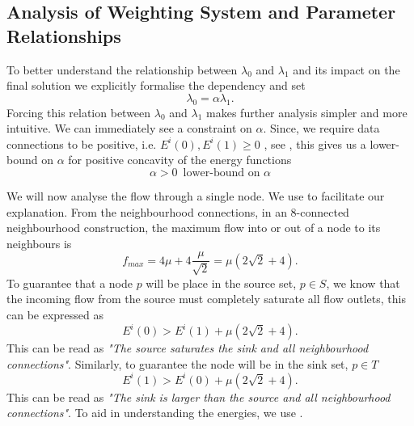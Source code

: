 \subsection{Analysis of Weighting System and Parameter Relationships}
\label{sec:cvgc_analysis}


To better understand the relationship between $\lambda_0$ and $\lambda_1$ and its impact on the final solution we explicitly formalise the dependency and set
\begin{equation}
	\lambda_0 = \alpha\lambda_1.
	\label{eq:l0l1dependancy}
\end{equation}
Forcing this relation between $\lambda_0$ and $\lambda_1$ makes further analysis simpler and more intuitive. We can immediately see a constraint on $\alpha$. Since, we require data connections to be positive, i.e. $E^i(0), E^i(1) \geq 0$ , see , this gives us a lower-bound on $\alpha$ for positive concavity of the energy functions
\begin{equation}
	\alpha > 0 \,\text{ lower-bound on } \alpha
\end{equation}

We will now analyse the flow through a single node. We use   to facilitate our explanation. From the neighbourhood connections, in an 8-connected neighbourhood construction, the maximum flow into or out of a node to its neighbours is 
\begin{equation}
	f_{max} = 4\mu + 4\frac{\mu}{\sqrt{2}} = \mu \left( 2\sqrt{2} + 4\right).
	\label{eq:neighbourhoodsaturation}
\end{equation}
To guarantee that a node $p$ will be place in the source set, $p \in S$, we know that the incoming flow from the source must completely saturate all flow outlets, this can be expressed as
\begin{equation}
	E^i(0) > E^i(1) + \mu \left( 2\sqrt{2} + 4\right).
	\label{eq:sourcesaturation}
\end{equation}
This can be read as \textit{"The source saturates the sink and all neighbourhood connections"}.
Similarly, to guarantee the node will be in the sink set, $p \in T$
\begin{equation}
E^i(1) > E^i(0) + \mu \left( 2\sqrt{2} + 4\right).
\end{equation}
This can be read as \textit{"The sink is larger than the source and all neighbourhood connections"}. To aid in understanding the energies, we use .

